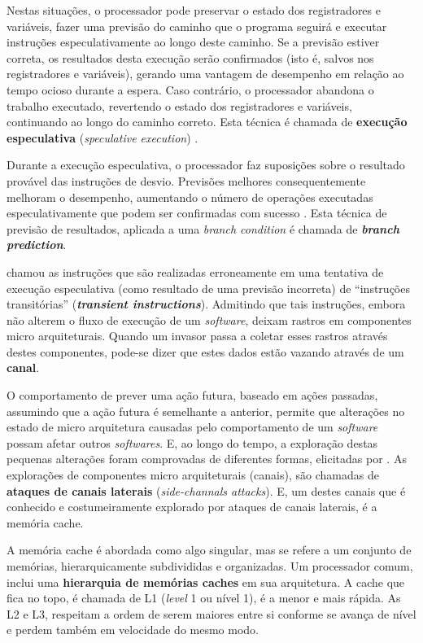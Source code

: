 \documentclass[
	article,			    %
	12pt,				    %
	oneside,			    %
	a4paper,			    %
	chapter=TITLE,		    %
	section=TITLE,		    %
	subsection=TITLE,	    %
	english,			    %
	brazil,				    %
	sumario=tradicional
]{abntex2}
\begin{document}
Nestas situações, o processador pode preservar o estado dos registradores e variáveis, fazer uma previsão do caminho que o programa seguirá e executar instruções especulativamente ao longo deste caminho. Se a previsão estiver correta, os resultados desta execução serão confirmados (isto é, salvos nos registradores e variáveis), gerando uma vantagem de desempenho em relação ao tempo ocioso durante a espera. Caso contrário, o processador abandona o trabalho executado, revertendo o estado dos registradores e variáveis, continuando ao longo do caminho correto. Esta técnica é chamada de \textbf{execução especulativa} (\emph{speculative execution}) \cite{Kocher2018Spectre}.

Durante a execução especulativa, o processador faz suposições sobre o resultado provável das instruções de desvio. Previsões melhores consequentemente melhoram o desempenho, aumentando o número de operações executadas especulativamente que podem ser confirmadas com sucesso \cite{Kocher2018Spectre}. Esta técnica de previsão de resultados, aplicada a uma \emph{branch condition} é chamada de \textbf{\emph{branch prediction}}.

 chamou as instruções que são realizadas erroneamente em uma tentativa de execução especulativa (como resultado de uma previsão incorreta) de ``instruções transitórias'' (\textbf{\emph{transient instructions}}). Admitindo que tais instruções, embora não alterem o fluxo de execução de um \emph{software}, deixam rastros em componentes micro arquiteturais. Quando um invasor passa a coletar esses rastros através destes componentes, pode-se dizer que estes dados estão vazando através de um \textbf{canal}.

O comportamento de prever uma ação futura, baseado em ações passadas, assumindo que a ação futura é semelhante a anterior, permite que alterações no estado de micro arquitetura causadas pelo comportamento de um \emph{software} possam afetar outros \emph{softwares}. E, ao longo do tempo, a exploração destas pequenas alterações foram comprovadas de diferentes formas, elicitadas por . As explorações de componentes micro arquiteturais (canais), são chamadas de \textbf{ataques de canais laterais} (\emph{side-channals attacks}). E, um destes canais que é conhecido e costumeiramente explorado por ataques de canais laterais, é a memória cache.

A memória cache é abordada como algo singular, mas se refere a um conjunto de memórias, hierarquicamente subdivididas e organizadas. Um processador comum, inclui uma \textbf{hierarquia de memórias caches} em sua arquitetura. A cache que fica no topo, é chamada de L1 (\emph{level} 1 ou nível 1), é a menor e mais rápida. As L2 e L3, respeitam a ordem de serem maiores entre si conforme se avança de nível e perdem também em velocidade do mesmo modo.
\end{document}
